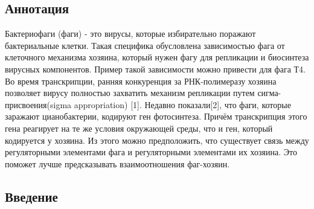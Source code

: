 \documentclass[14pt]{extarticle}
\begin{document}
%


\newpage
\tableofcontents

\newpage
\begin{center}
\item \section{Аннотация}
\end{center}

\par{Бактериофаги (фаги) - это вирусы, которые избирательно поражают бактериальные клетки. Такая специфика обусловлена
зависимостью фага от клеточного механизма хозяина, который нужен фагу для репликации и биосинтеза вирусных компонентов.
Пример такой зависимости  можно привести для фага Т4. Во время транскрипции, ранняя конкуренция за РНК-полимеразу
хозяина позволяет вирусу полностью захватить механизм репликации путем сигма-присвоения(sigma appropriation) [1].
Недавно показали[2], что фаги, которые заражают цианобактерии, кодируют ген фотосинтеза. Причём транскрипция этого гена
реагирует на те же условия окружающей среды, что и ген, который кодируется у хозяина. Из этого можно предположить, что
существует связь между регуляторными элементами фага и регуляторными элементами их хозяина. Это поможет лучше
предсказывать взаимоотношения фаг-хозяин.}



\newpage
\begin{center}
\item \section{Введение}
\end{center}
\end{document}
